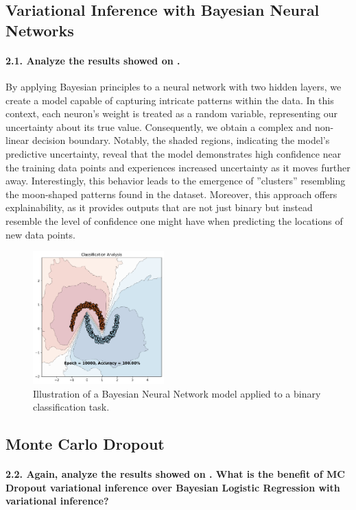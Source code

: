 \subsection{Variational Inference with Bayesian Neural Networks}
\paragraph{2.1. Analyze the results showed on .}

By applying Bayesian principles to a neural network with two hidden layers, we create a model capable of capturing intricate patterns within the data. In this context, each neuron's weight is treated as a random variable, representing our uncertainty about its true value. Consequently, we obtain a complex and non-linear decision boundary. Notably, the shaded regions, indicating the model's predictive uncertainty, reveal that the model demonstrates high confidence near the training data points and experiences increased uncertainty as it moves further away. Interestingly, this behavior leads to the emergence of ''clusters'' resembling the moon-shaped patterns found in the dataset. Moreover, this approach offers explainability, as it provides outputs that are not just binary but instead resemble the level of confidence one might have when predicting the locations of new data points.

\begin{figure}[H]
    \centering
    \includegraphics[width=0.45\textwidth]{mlp_variational.pdf}
    \caption{Illustration of a Bayesian Neural Network model applied to a binary classification task.}
    \label{fig:mlp_variational}
\end{figure}

\subsection{Monte Carlo Dropout}
\paragraph{2.2. Again, analyze the results showed on . What is the benefit of MC Dropout variational inference over Bayesian Logistic Regression with variational inference?}


